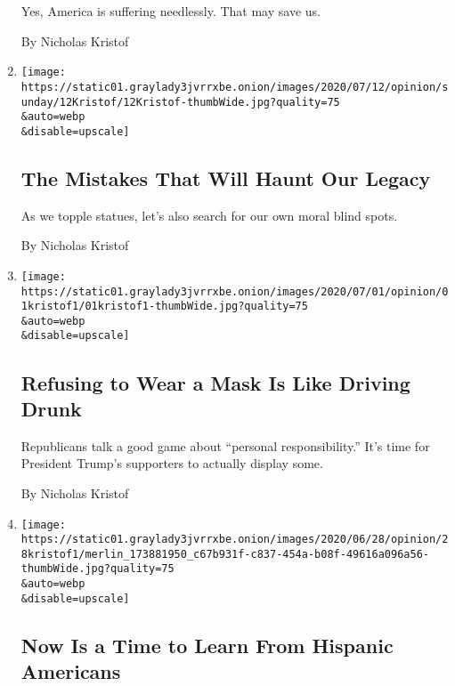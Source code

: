 \begin{enumerate}
  Yes, America is suffering needlessly. That may save us.

  By Nicholas Kristof
\item
  \href{/2020/07/11/opinion/sunday/animal-rights-cruelty.html}{}

  \texttt{[image: https://static01.graylady3jvrrxbe.onion/images/2020/07/12/opinion/sunday/12Kristof/12Kristof-thumbWide.jpg?quality=75\\\&auto=webp\\\&disable=upscale]}

  \hypertarget{the-mistakes-that-will-haunt-our-legacy}{%
  \subsection{The Mistakes That Will Haunt Our
  Legacy}\label{the-mistakes-that-will-haunt-our-legacy}}

  As we topple statues, let's also search for our own moral blind spots.

  By Nicholas Kristof
\item
  \href{/2020/07/01/opinion/coronavirus-face-masks.html}{}

  \texttt{[image: https://static01.graylady3jvrrxbe.onion/images/2020/07/01/opinion/01kristof1/01kristof1-thumbWide.jpg?quality=75\\\&auto=webp\\\&disable=upscale]}

  \hypertarget{refusing-to-wear-a-mask-is-like-driving-drunk}{%
  \subsection{Refusing to Wear a Mask Is Like Driving
  Drunk}\label{refusing-to-wear-a-mask-is-like-driving-drunk}}

  Republicans talk a good game about ``personal responsibility.'' It's
  time for President Trump's supporters to actually display some.

  By Nicholas Kristof
\item
  \href{/2020/06/27/opinion/sunday/hispanic-americans.html}{}

  \texttt{[image: https://static01.graylady3jvrrxbe.onion/images/2020/06/28/opinion/28kristof1/merlin\_173881950\_c67b931f-c837-454a-b08f-49616a096a56-thumbWide.jpg?quality=75\\\&auto=webp\\\&disable=upscale]}

  \hypertarget{now-is-a-time-to-learn-from-hispanic-americans}{%
  \subsection{Now Is a Time to Learn From Hispanic
  Americans}\label{now-is-a-time-to-learn-from-hispanic-americans}}


\end{enumerate}
